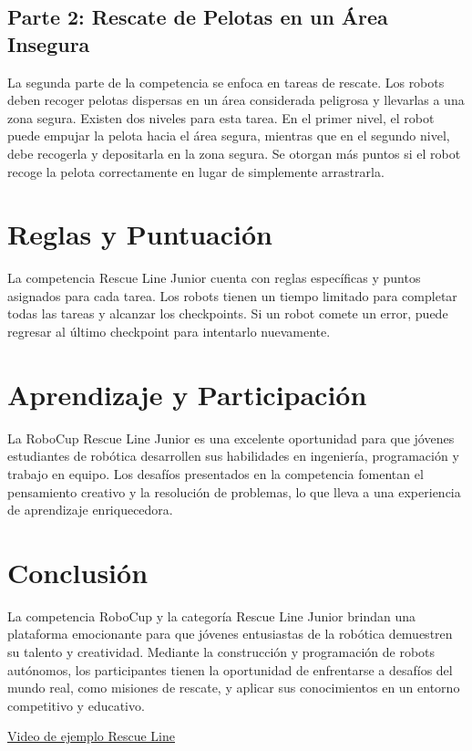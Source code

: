 \documentclass{article}
\begin{document}
\subsection{Parte 2: Rescate de Pelotas en un Área Insegura}
La segunda parte de la competencia se enfoca en tareas de rescate. Los robots deben recoger pelotas dispersas en un área considerada peligrosa y llevarlas a una zona segura. Existen dos niveles para esta tarea. En el primer nivel, el robot puede empujar la pelota hacia el área segura, mientras que en el segundo nivel, debe recogerla y depositarla en la zona segura. Se otorgan más puntos si el robot recoge la pelota correctamente en lugar de simplemente arrastrarla.

\section{Reglas y Puntuación}
La competencia Rescue Line Junior cuenta con reglas específicas y puntos asignados para cada tarea. Los robots tienen un tiempo limitado para completar todas las tareas y alcanzar los checkpoints. Si un robot comete un error, puede regresar al último checkpoint para intentarlo nuevamente.

\section{Aprendizaje y Participación}
La RoboCup Rescue Line Junior es una excelente oportunidad para que jóvenes estudiantes de robótica desarrollen sus habilidades en ingeniería, programación y trabajo en equipo. Los desafíos presentados en la competencia fomentan el pensamiento creativo y la resolución de problemas, lo que lleva a una experiencia de aprendizaje enriquecedora.

\section{Conclusión}
La competencia RoboCup y la categoría Rescue Line Junior brindan una plataforma emocionante para que jóvenes entusiastas de la robótica demuestren su talento y creatividad. Mediante la construcción y programación de robots autónomos, los participantes tienen la oportunidad de enfrentarse a desafíos del mundo real, como misiones de rescate, y aplicar sus conocimientos en un entorno competitivo y educativo.

\href{https://www.youtube.com/watch?v=GoGdpmvcXAc}{Video de ejemplo Rescue Line}
\end{document}
